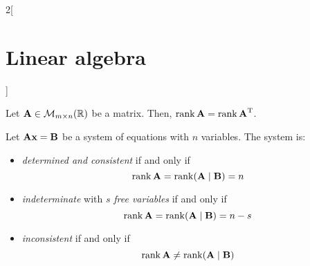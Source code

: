 \documentclass[../../../main_math.tex]{subfiles}
\begin{document}
\begin{multicols}{2}[\section{Linear algebra}]
\begin{definition}[Transposition]
  \end{definition}
  \begin{proposition}
    Let $\boldsymbol{\mathrm{A}}\in\mathcal{M}_{m\times n}(\mathbb{R})$ be a matrix. Then, $\rank \boldsymbol{\mathrm{A}}=\rank{\boldsymbol{\mathrm{A}}}^{\mathrm{T}}$.
  \end{proposition}
  \begin{theorem}
    Let $\boldsymbol{\mathrm{A}}\boldsymbol{\mathrm{x}}=\boldsymbol{\mathrm{B}}$ be a system of equations with $n$ variables. The system is:
    \begin{itemize}
      \item \emph{determined and consistent} if and only if $$\rank \boldsymbol{\mathrm{A}}=\rank (\boldsymbol{\mathrm{A}}\mid \boldsymbol{\mathrm{B}})=n$$
      \item \emph{indeterminate} with $s$ \emph{free variables} if and only if $$\rank \boldsymbol{\mathrm{A}}=\rank (\boldsymbol{\mathrm{A}}\mid \boldsymbol{\mathrm{B}})=n-s$$
      \item \emph{inconsistent} if and only if $$\rank \boldsymbol{\mathrm{A}}\ne\rank (\boldsymbol{\mathrm{A}}\mid \boldsymbol{\mathrm{B}})$$
    \end{itemize}
  \end{theorem}

\end{multicols}
\end{document}
